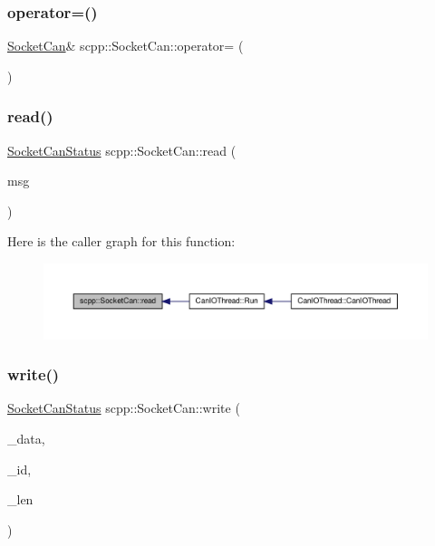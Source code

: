 \subsubsection{\texorpdfstring{operator=()}{operator=()}}
{\footnotesize\ttfamily \hyperlink{classscpp_1_1SocketCan}{Socket\+Can}\& scpp\+::\+Socket\+Can\+::operator= (\begin{DoxyParamCaption}\item[{const \hyperlink{classscpp_1_1SocketCan}{Socket\+Can} \&}]{ }\end{DoxyParamCaption})\hspace{0.3cm}{\ttfamily [delete]}}

\mbox{\label{classscpp_1_1SocketCan_aa104c900d3e10722e3c1326c1322ee91}} 
\subsubsection{\texorpdfstring{read()}{read()}}
{\footnotesize\ttfamily \hyperlink{namespacescpp_abc60b9ed5f90c311397500d39ff15ef2}{Socket\+Can\+Status} scpp\+::\+Socket\+Can\+::read (\begin{DoxyParamCaption}\item[{\hyperlink{structscpp_1_1CanFrame}{Can\+Frame} \&}]{msg }\end{DoxyParamCaption})}

Here is the caller graph for this function\+:
\nopagebreak
\begin{figure}[H]
\begin{center}
\leavevmode
\includegraphics[width=350pt]{classscpp_1_1SocketCan_aa104c900d3e10722e3c1326c1322ee91_icgraph}
\end{center}
\end{figure}
\mbox{\label{classscpp_1_1SocketCan_af0e968a352380922dcde307e73b76f12}} 
\subsubsection{\texorpdfstring{write()}{write()}\hspace{0.1cm}{\footnotesize\ttfamily [1/3]}}
{\footnotesize\ttfamily \hyperlink{namespacescpp_abc60b9ed5f90c311397500d39ff15ef2}{Socket\+Can\+Status} scpp\+::\+Socket\+Can\+::write (\begin{DoxyParamCaption}\item[{const uint8\+\_\+t $\ast$}]{\+\_\+data,  }\item[{const uint32\+\_\+t \&}]{\+\_\+id,  }\item[{const uint8\+\_\+t \&}]{\+\_\+len }\end{DoxyParamCaption})}

